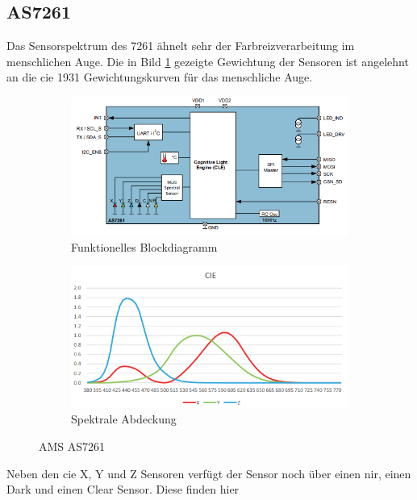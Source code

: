 \documentclass[11pt]{scrartcl}
\begin{document}
\subsection{AS7261}
Das Sensorspektrum des 7261 ähnelt sehr der Farbreizverarbeitung im menschlichen Auge. Die in Bild \ref{fig:AS7261_spectrum} gezeigte
Gewichtung der Sensoren ist angelehnt an die \ac{cie} 1931 Gewichtungskurven für das menschliche Auge.
\begin{figure}[H]
    \centering
    \begin{subfigure}[b]{0.49\textwidth}
        \includegraphics[width=\textwidth]{images/AS7261_functional_blockdiagram.png}
        \caption{Funktionelles Blockdiagramm}
    \end{subfigure}
    \hfill 
    \begin{subfigure}[b]{0.49\textwidth}
        \includegraphics[width=\textwidth]{images/AS7261_spectrum.png}
        \caption{Spektrale Abdeckung}\label{fig:AS7261_spectrum}
    \end{subfigure}
    \caption[AMS AS7261]{AMS AS7261 \cite{datasheet61}}\label{fig:AS7261}
\end{figure}
\noindent
Neben den \ac{cie} X, Y und Z Sensoren verfügt der Sensor noch über einen \ac{nir}, einen Dark und einen Clear Sensor. Diese finden hier
\end{document}
